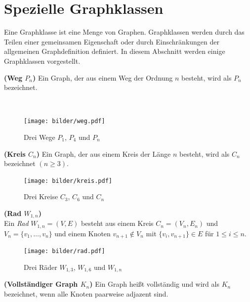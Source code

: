 \section{Spezielle Graphklassen}
\vspace{-3mm}
Eine Graphklasse ist eine Menge von Graphen. Graphklassen werden durch das Teilen einer gemeinsamen Eigenschaft oder durch Einschränkungen der allgemeinen Graphdefinition definiert. In diesem Abschnitt werden einige Graphklassen vorgestellt.

\begin{defi}{\textbf{(Weg $P_n$)}}\newline
Ein Graph, der aus einem Weg der Ordnung $n$ besteht, wird als $P_n$ bezeichnet. \end{defi}
\vspace{-13mm}
~\linebreak
\begin{figure}[h!]
		\centering 		 
   \texttt{[image: bilder/weg.pdf]}
	\caption{Drei Wege $P_1$, $P_4$ und $P_n$}
  	 \end{figure}
\vspace{-7mm}
\begin{defi}{\textbf{(Kreis $C_n$)}}\newline
Ein Graph, der aus einem Kreis der Länge $n$ besteht, wird als $C_n$ bezeichnet $(n \geq 3)$. \end{defi}
\vspace{-5mm}
\begin{figure}[h!]
		\centering 		 
   \texttt{[image: bilder/kreis.pdf]}
	\caption{Drei Kreise $C_3$, $C_6$ und $C_n$}
  	 \end{figure}
\vspace{-4mm}
\begin{defi}{\textbf{(Rad $W_{1,n}$)}}\\
Ein \emph{Rad} $W_{1,n}=(V,E)$ besteht aus einem Kreis $C_n=(V_n,E_n)$ und $V_n=\{v_1, \ldots ,v_n\}$ und einem Knoten $v_{n+1} \notin V_n$ mit $\{v_i, v_{n+1} \} \in E$ für $1 \leq i \leq n$. 
\end{defi}
\vspace{-5mm}
\begin{figure}[h!]
		\centering 		 
   \texttt{[image: bilder/rad.pdf]}
	\caption{Drei Räder $W_{1,3}$, $W_{1,6}$ und $W_{1,n}$}
  	 \end{figure}
\vspace{-4mm}
\begin{defi}{\textbf{(Vollständiger Graph $K_n$)}}\newline
Ein Graph heißt vollständig und wird als $K_n$ bezeichnet, wenn alle Knoten paarweise adjazent sind.
\end{defi}
